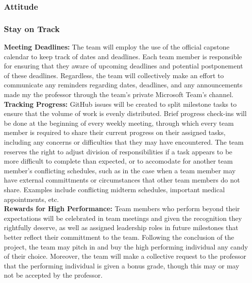 \documentclass{article}
\begin{document}

\subsubsection*{Attitude}


\subsubsection*{Stay on Track}

\noindent\textbf{Meeting Deadlines:} The team will employ the use of the official capstone calendar to keep track of dates and deadlines. Each team member is responsible for ensuring that they aware of
upcoming deadlines and potential postponement of these deadlines. Regardless, the team will collectively make an effort to communicate any reminders regarding dates, deadlines,
and any announcements made my the professor through the team's private Microsoft Team's channel. \\

\noindent\textbf{Tracking Progress:} GitHub issues will be created to split milestone tasks to ensure that the volume of work is evenly distributed. Brief progress check-ins will be done at the beginning of every weekly meeting, through which every 
team member is required to share their current progress on their assigned tasks, including any concerns or difficulties that they may have encountered. The team reserves the right to adjust division of responsibilities if a task appears to be
more difficult to complete than expected, or to accomodate for another team member's conflicting schedules, such as in the case when a team member may have external committments or circumstances that other team members do not share. Examples include
conflicting midterm schedules, important medical appointments, etc. \\

\noindent\textbf{Rewards for High Performance:} Team members who perform beyond their expectations will be celebrated in team meetings and given the recognition they rightfully deserve, as well as assigned leadership roles in future milestones that better reflect their
committment to the team. Following the conclusion of the project, the team may pitch in and buy the high performing individual any candy of their choice. Moreover, the team will make a collective request to the professor that the performing individual is given a bonus grade,
though this may or may not be accepted by the professor. \\
\end{document}

